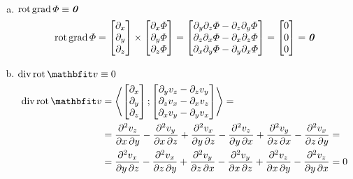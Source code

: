 \documentclass{szb-solution}
\begin{document}
\begin{enumerate}[a)]
  \item $\operatorname{rot} \operatorname{grad} \varPhi \equiv \text{\textbf{\textit{0}}}$
        $$
          \operatorname{rot} \operatorname{grad} \varPhi
          = \begin{bmatrix}
            \partial_x \\ \partial_y \\ \partial_z
          \end{bmatrix} \times \begin{bmatrix}
            \partial_x \varPhi \\ \partial_y \varPhi \\ \partial_z \varPhi
          \end{bmatrix} = \begin{bmatrix}
            \partial_y \partial_z \varPhi - \partial_z \partial_y \varPhi \\
            \partial_z \partial_x \varPhi - \partial_x \partial_z \varPhi \\
            \partial_x \partial_y \varPhi - \partial_y \partial_x \varPhi
          \end{bmatrix} = \begin{bmatrix}
            0 \\ 0 \\ 0
          \end{bmatrix} = \text{\textbf{\textit{0}}}
        $$

  \item $\Div \rot \rvec v \equiv 0$
        \begin{align*}
          \Div \rot \rvec v
           & = \scalar{\begin{bmatrix}
                           \partial_x \\ \partial_y \\ \partial_z
                         \end{bmatrix}}{\begin{bmatrix}
                                          \partial_y v_z - \partial_z v_y \\
                                          \partial_z v_x - \partial_x v_z \\
                                          \partial_x v_y - \partial_y v_x
                                        \end{bmatrix}}
          =
          \\
           & = \pdv{v_z}{x, y} - \pdv{v_y}{x, z}
          + \pdv{v_x}{y, z} - \pdv{v_z}{y, x}
          + \pdv{v_y}{z, x} - \pdv{v_x}{z, y}
          =
          \\
           & = \pdv{v_x}{y, z} - \pdv{v_x}{z, y}
          + \pdv{v_y}{z, x} - \pdv{v_y}{x, z}
          + \pdv{v_z}{x, y} - \pdv{v_z}{y, x}
          = 0
        \end{align*}


\end{enumerate}
\end{document}
